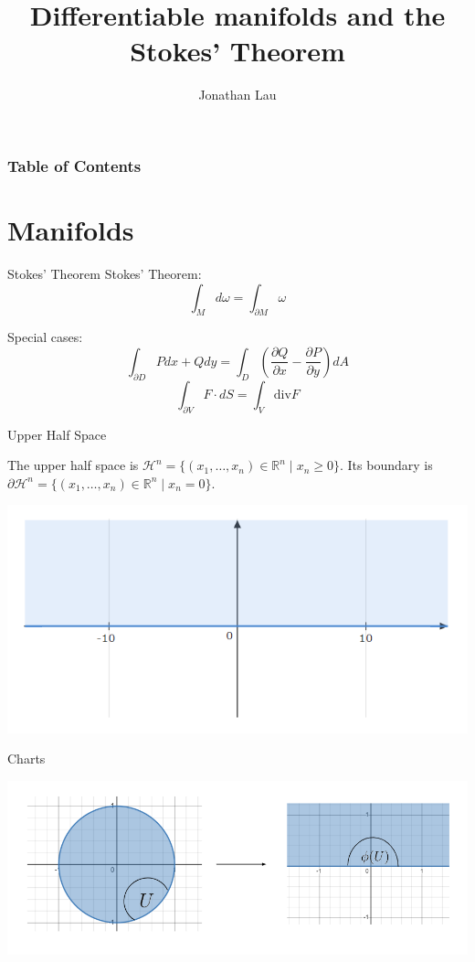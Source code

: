 \documentclass[9pt]{beamer}
\title[Differentiable manifolds and the Stokes' Theorem]
{Differentiable manifolds and the Stokes' Theorem}
\author[Jonathan Lau] %
{Jonathan Lau}
\begin{document}
	
\frame{\titlepage}

\begin{frame}
	\frametitle{Table of Contents}
	\tableofcontents
\end{frame}

\section{Manifolds}
	
\begin{frame}{Stokes' Theorem}
    Stokes' Theorem:\[\int_Md\omega = \int_{\partial M} \omega\]

    Special cases: \[\int_{\partial D} Pdx+Qdy = \int_D \left(\frac{\partial Q}{\partial x}-\frac{\partial P}{\partial y}\right) dA\]
    \[\int_{\partial V}  F\cdot dS = \int_V \text{div} F\]
\end{frame}

\begin{frame}{Upper Half Space}
    \begin{block}{}
        The upper half space is $\mathcal{H}^n=\{(x_1, \dots, x_n)\in \mathbb{R}^n\mid x_n \geq 0\}$. Its boundary is $\partial \mathcal{H}^n = \{(x_1, \dots, x_n)\in \mathbb{R}^n\mid x_n = 0\}$.
    \end{block}
    \includegraphics[scale=0.6]{upper_half.PNG}

\end{frame}
\begin{frame}{Charts}

    \includegraphics[scale=0.6]{chart.PNG}
    
\end{frame}
\end{document}
